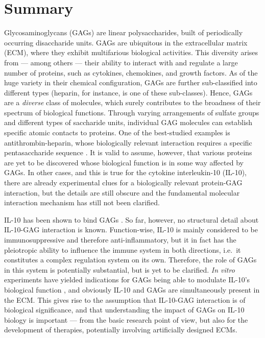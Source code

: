 
\vspace{-1.5cm}

\chapter{Summary}



Glycosaminoglycans (GAGs) are linear polysaccharides, built of periodically
occurring disaccharide units. GAGs are ubiquitous in the extracellular matrix
(ECM), where they exhibit multifarious biological activities. This diversity
arises from --- among others --- their ability to interact with and regulate a
large number of proteins, such as cytokines, chemokines, and growth factors. As
of the huge variety in their chemical configuration, GAGs are further
sub-classified into different types (heparin, for instance, is one of these
sub-classes). Hence, GAGs are a \textit{diverse} class of molecules, which
surely contributes to the broadness of their spectrum of biological functions.
Through varying arrangements of sulfate groups and different types of saccharide
units, individual GAG molecules can establish specific atomic contacts to
proteins. One of the best-studied examples is antithrombin-heparin, whose
biologically relevant interaction requires a specific pentasaccharide sequence
\cite{antithrombin-thrombin-heparin-2004}. It is valid to assume, however, that
various proteins are yet to be discovered whose biological function is in some
way affected by GAGs. In other cases, and this is true for the cytokine
interleukin-10 (IL-10), there are already experimental clues for a biologically
relevant protein-GAG interaction, but the details are still obscure and the
fundamental molecular interaction mechanism has still not been clarified.

IL-10 has been shown to bind GAGs \cite{salek_ardakani_2000}. So far, however,
no structural detail about IL-10-GAG interaction is known. Function-wise, IL-10
is mainly considered to be immunosuppressive and therefore anti-inflammatory,
but it in fact has the pleiotropic ability to influence the immune system in
both directions, i.e.\ it constitutes a complex regulation system on its own.
Therefore, the role of GAGs in this system is potentially substantial, but is
yet to be clarified. \textit{In vitro} experiments have yielded indications for
GAGs being able to modulate IL-10's biological function
\cite{salek_ardakani_2000}, and obviously IL-10 and GAGs are simultaneously
present in the ECM. This gives rise to the assumption that IL-10-GAG interaction
is of biological significance, and that understanding the impact of GAGs on
IL-10 biology is important --- from the basic research point of view, but also
for the development of therapies, potentially involving artificially designed
ECMs.


